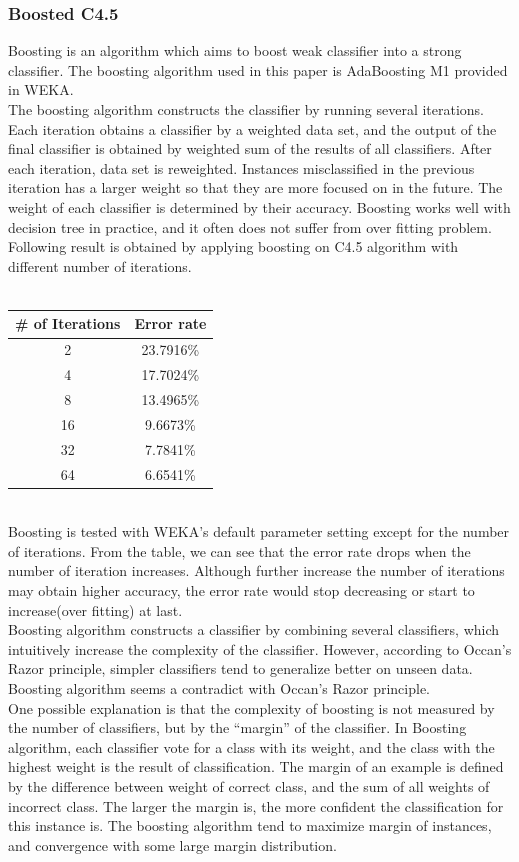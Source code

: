 \documentclass[a4paper,11pt]{nurop}
\begin{document}
\subsubsection{Boosted C4.5}
Boosting is an algorithm which aims to boost weak classifier into a strong classifier. The boosting algorithm used in this paper is AdaBoosting M1 provided in WEKA.\\
The boosting algorithm constructs the classifier by running several iterations. Each iteration obtains a classifier by a weighted data set, and the output of the final classifier is obtained by weighted sum of the results of all classifiers. After each iteration, data set is reweighted. Instances misclassified in the previous iteration has a larger weight so that they are more focused on in the future. The weight of each classifier is determined by their accuracy. Boosting works well with decision tree in practice, and it often does not suffer from over fitting problem.\\
Following result is obtained by applying boosting on C4.5 algorithm with different number of iterations.\\
\vspace{0.5cm}\\
\begin{tabular}{c c}
\# of Iterations	& Error rate\\
\hline \hline
	2		& 23.7916\%\\
	4		& 17.7024\%\\
	8		& 13.4965\%\\
	16		& 9.6673\%\\
    32      & 7.7841\%\\
    64      & 6.6541\%\\
\end{tabular}
\vspace{0.5cm}\\
Boosting is tested with WEKA's default parameter setting except for the number of iterations. From the table, we can see that the error rate drops when the number of iteration increases. Although further increase the number of iterations may obtain higher accuracy, the error rate would stop decreasing or start to increase(over fitting) at last.\\
Boosting algorithm constructs a classifier by combining several classifiers, which intuitively increase the complexity of the classifier. However, according to Occan's Razor principle, simpler classifiers tend to generalize better on unseen data. Boosting algorithm seems a contradict with Occan's Razor principle.\\
One possible explanation is that the complexity of boosting is not measured by the number of classifiers, but by the ``margin'' of the classifier.
In Boosting algorithm, each classifier vote for a class with its weight, and the class with the highest weight is the result of classification. The margin of an example is defined by the difference between weight of correct class, and the sum of all weights of incorrect class. The larger the margin is, the more confident the classification for this instance is. The boosting algorithm tend to maximize margin of instances, and convergence with some large margin distribution\cite{boosting}.\\
\end{document}
